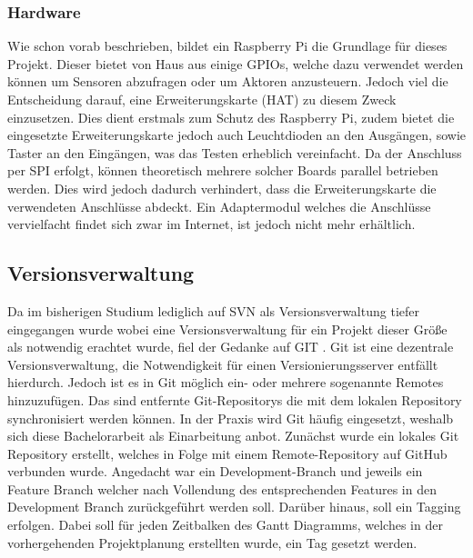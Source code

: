 \subsubsection{Hardware}\label{chp:gundl:hardware}
Wie schon vorab beschrieben, bildet ein Raspberry Pi die Grundlage für dieses Projekt. Dieser bietet von Haus aus einige GPIOs, welche  dazu  verwendet werden können um Sensoren abzufragen oder um Aktoren anzusteuern. Jedoch viel die Entscheidung darauf, eine Erweiterungskarte (HAT) zu diesem Zweck einzusetzen. Dies dient erstmals zum Schutz des Raspberry Pi, zudem bietet die eingesetzte Erweiterungskarte jedoch auch Leuchtdioden an den Ausgängen, sowie Taster an den Eingängen, was das Testen erheblich vereinfacht. Da der Anschluss per SPI erfolgt, können theoretisch mehrere solcher Boards parallel betrieben werden. Dies wird jedoch dadurch verhindert, dass die Erweiterungskarte die verwendeten Anschlüsse abdeckt. Ein Adaptermodul welches die Anschlüsse vervielfacht findet sich zwar im Internet, ist jedoch nicht mehr erhältlich. 

\subsection{Versionsverwaltung}
Da im bisherigen Studium lediglich auf SVN \cite{URL:SVN} als Versionsverwaltung tiefer eingegangen wurde wobei eine Versionsverwaltung für ein Projekt dieser Größe als notwendig erachtet wurde, fiel der Gedanke auf GIT \cite{URL:GIT}. Git ist eine dezentrale Versionsverwaltung, die Notwendigkeit für einen Versionierungsserver entfällt hierdurch. Jedoch ist es in Git möglich ein- oder mehrere sogenannte Remotes hinzuzufügen. Das sind entfernte Git-Repositorys die mit dem lokalen Repository synchronisiert werden können. In der Praxis wird Git häufig eingesetzt, weshalb sich diese Bachelorarbeit als Einarbeitung anbot. Zunächst wurde ein lokales Git Repository erstellt, welches in Folge mit einem Remote-Repository auf GitHub verbunden wurde. Angedacht war ein Development-Branch und jeweils ein Feature Branch welcher nach Vollendung des entsprechenden Features in den Development Branch zurückgeführt werden soll. Darüber hinaus, soll ein Tagging erfolgen. Dabei soll für jeden Zeitbalken des Gantt Diagramms, welches in der vorhergehenden Projektplanung erstellten wurde, ein Tag gesetzt werden. 


